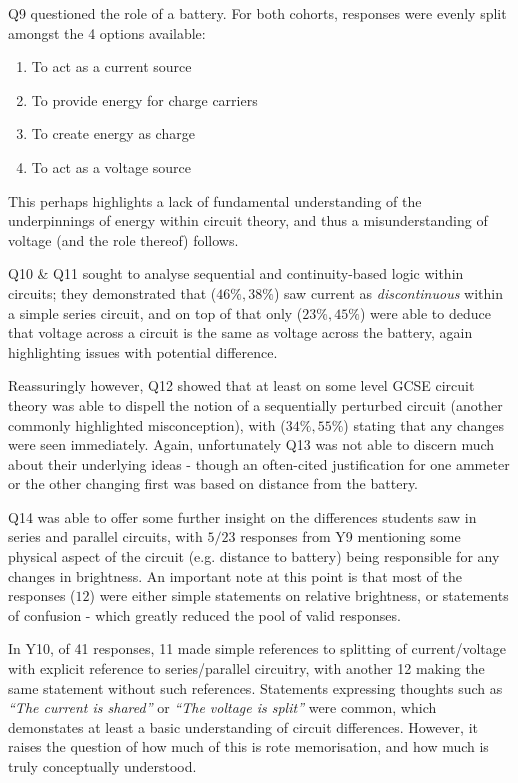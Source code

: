 \documentclass[a4paper,openany,nobib]{tufte-book}
\begin{document}
Q9 questioned the role of a battery. For both cohorts, responses were evenly split amongst the 4 options available:
\begin{enumerate}
	\item To act as a current source
	\item To provide energy for charge carriers
	\item To create energy as charge
	\item To act as a voltage source
\end{enumerate}
This perhaps highlights a lack of fundamental understanding of the underpinnings of energy within circuit theory, and thus a misunderstanding of voltage (and the role thereof) follows.

Q10 \& Q11 sought to analyse sequential and continuity-based logic within circuits; they demonstrated that ($46\%,38\%$) saw current as \emph{discontinuous} within a simple series circuit, and on top of that only ($23\%,45\%$) were able to deduce that voltage across a circuit is the same as voltage across the battery, again highlighting issues with potential difference.

Reassuringly however, Q12 showed that at least on some level GCSE circuit theory was able to dispell the notion of a sequentially perturbed circuit (another commonly highlighted misconception), with ($34\%,55\%$) stating that any changes were seen immediately. Again, unfortunately Q13 was not able to discern much about their underlying ideas - though an often-cited justification for one ammeter or the other changing first was based on distance from the battery.


Q14 was able to offer some further insight on the differences students saw in series and parallel circuits, with $5/23 $ responses from Y9 mentioning some physical aspect of the circuit (e.g. distance to battery) being responsible for any changes in brightness. An important note at this point is that most of the responses ($12$) were either simple statements on relative brightness, or statements of confusion - which greatly reduced the pool of valid responses.

In Y10, of 41 responses, 11 made simple references to splitting of current/voltage with explicit reference to series/parallel circuitry, with another 12 making the same statement without such references. Statements expressing thoughts such as \emph{``The current is shared''} or \emph{``The voltage is split''} were common, which demonstates at least a basic understanding of circuit differences. However, it raises the question of how much of this is rote memorisation, and how much is truly conceptually understood.
\end{document}
